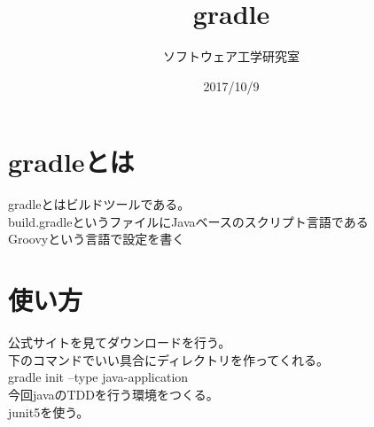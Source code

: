 \documentclass{jsarticle}
\begin{document}
\title{gradle}
\author{ソフトウェア工学研究室}
\date{2017/10/9}

\maketitle

\section{gradleとは}
gradleとはビルドツールである。\\
build.gradleというファイルにJavaベースのスクリプト言語である\\
Groovyという言語で設定を書く\\
\section{使い方}
公式サイトを見てダウンロードを行う。\\
下のコマンドでいい具合にディレクトリを作ってくれる。\\
gradle init --type java-application\\

今回javaのTDDを行う環境をつくる。\\
junit5を使う。
\end{document}
